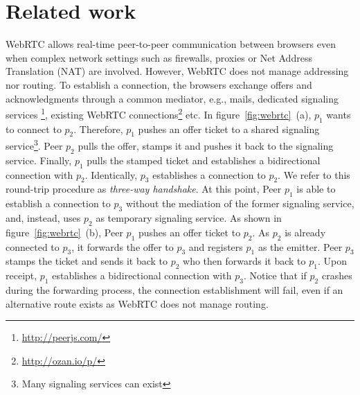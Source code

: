 
\begin{figure*}
\centering
{}
\hspace{5pt}
\hspace{5pt}
\caption{\label{fig:webrtc}Creating an overlay network on top of WebRTC.}
\end{figure*}


\section{Related work}
\label{sec:relatedwork}


WebRTC allows real-time peer-to-peer communication between browsers even when 
complex network settings such as firewalls, proxies or Net Address Translation
(NAT) are involved. However, WebRTC does not manage addressing nor routing. To
establish a connection, the browsers exchange offers and acknowledgments
through a common mediator, e.g., mails, dedicated signaling services
\footnote{\url{http://peerjs.com/}},
existing WebRTC connections\footnote{\url{http://ozan.io/p/}} etc. In
figure~\ref{fig:webrtc}~(a), $p_1$ wants to connect to $p_2$. Therefore, $p_1$
pushes an offer ticket to a shared signaling service\footnote{Many signaling
services can exist}. Peer $p_2$ pulls the offer, stamps it and pushes it back to
the signaling service. Finally, $p_1$ pulls the stamped ticket and establishes a
bidirectional connection with $p_2$.  Identically, $p_3$ establishes a
connection to $p_2$. We refer to this round-trip procedure as 
\emph{three-way handshake}. At this point, Peer $p_1$ is able to establish a 
connection to $p_3$ without the mediation of the former signaling service, and,
instead, uses $p_2$  as temporary signaling service.
As shown in figure~\ref{fig:webrtc}~(b), Peer $p_1$ pushes an offer ticket to
$p_2$. As $p_2$ is already connected to $p_3$, it forwards the
offer to $p_3$ and registers $p_1$ as the emitter. Peer $p_3$ stamps the ticket
and sends it back to $p_2$ who then forwards it back to $p_1$. Upon receipt, 
$p_1$ establishes a bidirectional connection with $p_3$.
Notice that if $p_2$
crashes during the forwarding process, the connection establishment will fail,
even if an alternative route exists as WebRTC does not manage routing.


